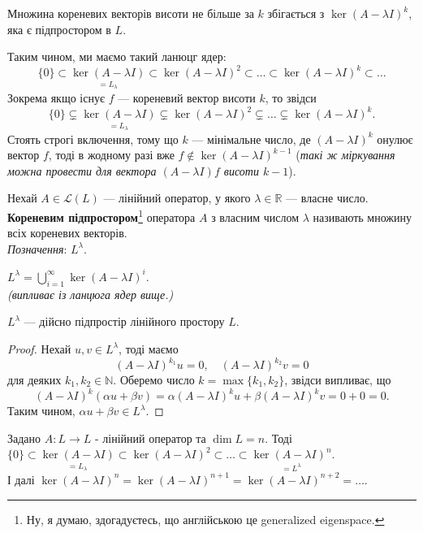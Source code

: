 \documentclass{math_library}
\begin{document}
\begin{remark}
Множина кореневих векторів висоти не більше за $k$ збігається з $\ker(A-\lambda I)^k$, яка є підпростором в $L$.
\end{remark}
\noindent
Таким чином, ми маємо такий ланюцг ядер:
\[
\{0\} \subset \underset{= L_\lambda}{\ker(A-\lambda I)} \subset \ker(A-\lambda I)^2 \subset \dots \subset \ker(A-\lambda I)^k \subset \dots
\]
Зокрема якщо існує $f$ --- кореневий вектор висоти $k$, то звідси
\[
\{0\} \subsetneq \underset{= L_\lambda}{\ker(A-\lambda I)} \subsetneq \ker(A-\lambda I)^2 \subsetneq \dots \subsetneq \ker(A-\lambda I)^k.
\]
Стоять строгі включення, тому що $k$ --- мінімальне число, де $(A-\lambda I)^k$ онулює вектор $f$, тоді в жодному разі вже $f \notin \ker(A-\lambda I)^{k-1}$ (\textit{такі ж міркування можна провести для вектора $(A-\lambda I)f$ висоти $k-1$}).

\begin{definition}
Нехай $A \in \mathcal{L}(L)$ --- лінійний оператор, у якого $\lambda \in \mathbb{R}$ --- власне число.\\
\textbf{Кореневим підпростором}\footnote{Ну, я думаю, здогадуєтесь, що англійською це generalized eigenspace.} оператора $A$ з власним числом $\lambda$ називають множину всіх кореневих векторів.\\
\textit{Позначення}: $L^\lambda$.
\end{definition}

\begin{corollary}
$L^\lambda = \displaystyle\bigcup_{i=1}^\infty \ker (A-\lambda I)^i$.\\
\textit{(випливає із ланцюга ядер вище.)}
\end{corollary}

\begin{proposition}
$L^\lambda$ --- дійсно підпростір лінійного простору $L$.
\end{proposition}

\begin{proof}
Нехай $u,v \in L^\lambda$, тоді маємо 
\[
(A-\lambda I)^{k_1}u = 0,\quad (A-\lambda I)^{k_2}v = 0
\]
для деяких $k_1,k_2 \in \mathbb{N}$. Оберемо число $k = \max \{k_1,k_2\}$, звідси випливає, що
\[
(A-\lambda I)^k (\alpha u + \beta v) = 
\alpha (A-\lambda I)^k u + \beta (A-\lambda I)^k v = 0 + 0 = 0.
\]
Таким чином, $\alpha u + \beta v \in L^\lambda$.
\end{proof}

\iffalse
\begin{proposition}
Задано $A: L \to L$ - лінійний оператор та $\dim L = n$. Тоді\\
$\{0\} \subset \underset{=L_\lambda}{\ker (A-\lambda I)} \subset \ker (A-\lambda I)^2 \subset \dots \subset \underset{=L^\lambda}{\ker (A-\lambda I)^n}$.\\
І далі $\ker (A-\lambda I)^n = \ker(A-\lambda I)^{n+1} = \ker(A-\lambda I)^{n+2} = \dots$.
\end{proposition}
\end{document}

